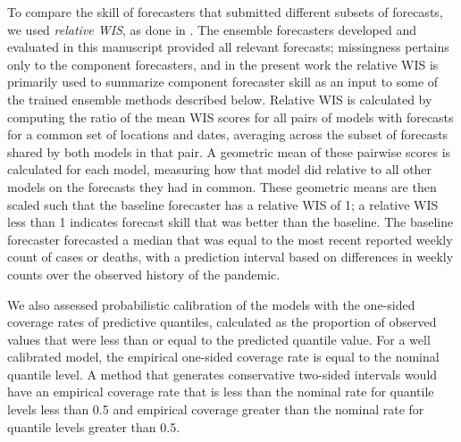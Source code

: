 \documentclass[11pt,3p,review,authoryear]{elsarticle}
\begin{document}
To compare the skill of forecasters that submitted different subsets of forecasts, we used \emph{relative WIS}, as done in \cite{cramerEvaluationIndividualEnsemble2021}.
The ensemble forecasters developed and evaluated in this manuscript provided all relevant forecasts; missingness pertains only to the component forecasters, and in the present work the relative WIS is primarily used to summarize component forecaster skill as an input to some of the trained ensemble methods described below.
Relative WIS is calculated by computing the ratio of the mean WIS scores for all pairs of models with forecasts for a common set of locations and dates, averaging across the subset of forecasts shared by both models in that pair. A geometric mean of these pairwise scores is calculated for each model, measuring how that model did relative to all other models on the forecasts they had in common. These geometric means are then scaled such that the baseline forecaster has a relative WIS of 1; a relative WIS less than 1 indicates forecast skill that was better than the baseline. The baseline forecaster forecasted a median that was equal to the most recent reported weekly count of cases or deaths, with a prediction interval based on differences in weekly counts over the observed history of the pandemic.

We also assessed probabilistic calibration of the models with the one-sided coverage rates of predictive quantiles, calculated as the proportion of observed values that were less than or equal to the predicted quantile value.
For a well calibrated model, the empirical one-sided coverage rate is equal to the nominal quantile level.
A method that generates conservative two-sided intervals would have an empirical coverage rate that is less than the nominal rate for quantile levels less than 0.5 and empirical coverage greater than the nominal rate for quantile levels greater than 0.5.


\end{document}
